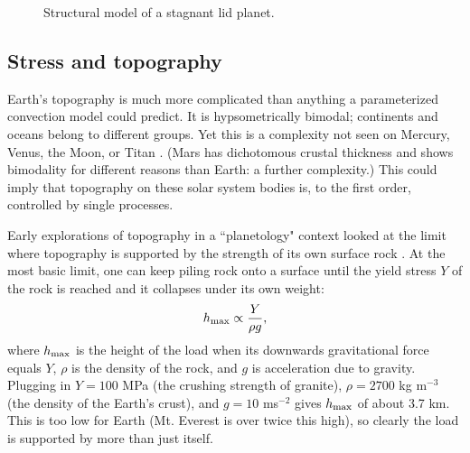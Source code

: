 \begin{figure}

  \centering
\caption{Structural model of a stagnant lid planet.}
\label{fig:stagnant_lid}
\end{figure}










\subsection{Stress and topography}

Earth's topography is much more complicated than anything a parameterized convection model could predict. It is hypsometrically bimodal; continents and oceans belong to different groups. Yet this is a complexity not seen on Mercury, Venus, the Moon, or Titan \citep{Keller2009, Lorenz2011}. (Mars has dichotomous crustal thickness and shows bimodality for different reasons than Earth: a further complexity.) This could imply that topography on these solar system bodies is, to the first order, controlled by single processes.

Early explorations of topography in a ``planetology" context looked at the limit where topography is supported by the strength of its own surface rock \citep{Jeffreys1929, Scheuer1981}. At the most basic limit, one can keep piling rock onto a surface until the yield stress $Y$ of the rock is reached and it collapses under its own weight:
\begin{equation}\label{eq:h_max}
h_{\rm max} \propto \frac{Y}{\rho g},
\end{equation}
where $h_{\rm max}$ is the height of the load when its downwards gravitational force equals $Y$, $\rho$ is the density of the rock, and $g$ is acceleration due to gravity. Plugging in $Y = 100$ MPa (the crushing strength of granite), $\rho = 2700$ kg m$^{-3}$ (the density of the Earth's crust), and $g = 10$ ms$^{-2}$ gives $h_{\rm max}$ of about 3.7 km. This is too low for Earth (Mt. Everest is over twice this high), so clearly the load is supported by more than just itself.

